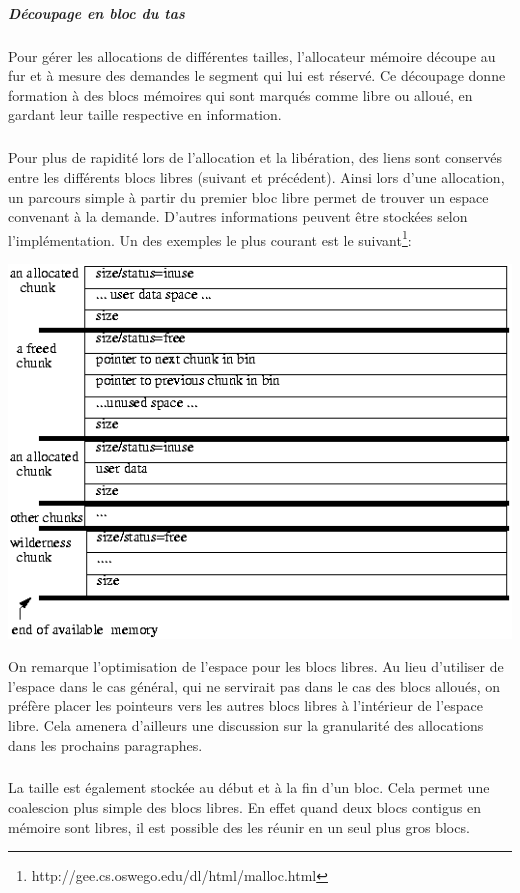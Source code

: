 \subparagraph{Découpage en bloc du tas}
Pour gérer les allocations de différentes tailles, l'allocateur mémoire découpe au fur et à mesure des demandes
le segment qui lui est réservé. Ce découpage donne formation à des blocs mémoires qui sont marqués comme libre ou alloué, en gardant leur taille respective
en information.
\subparagraph{}
Pour plus de rapidité lors de l'allocation et la libération, des liens sont conservés entre les différents blocs libres (suivant et précédent). Ainsi lors d'une allocation,
un parcours simple à partir du premier bloc libre permet de trouver un espace convenant à la demande. D'autres informations peuvent être stockées selon l'implémentation.
Un des exemples le plus courant est le suivant\footnote{http://gee.cs.oswego.edu/dl/html/malloc.html}:
\begin{center}
\includegraphics[scale=0.5]{malloc.png}\newline
\end{center}

On remarque l'optimisation de l'espace pour les blocs libres. Au lieu d'utiliser de l'espace dans le cas général, qui ne servirait pas dans le cas des blocs alloués,
on préfère placer les pointeurs vers les autres blocs libres à l'intérieur de l'espace libre. Cela amenera d'ailleurs une discussion sur la granularité des allocations dans
les prochains paragraphes.
\subparagraph{}
La taille est également stockée au début et à la fin d'un bloc. Cela permet une coalescion plus simple des blocs libres. En effet quand deux blocs contigus en
mémoire sont libres, il est possible des les réunir en un seul plus gros blocs.

